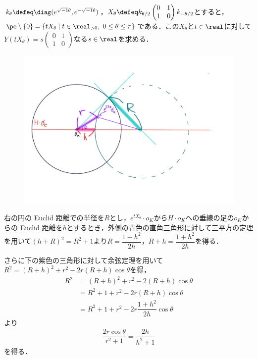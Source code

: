 \begin{npfwn}


  $k_{\theta} \defeq \diag(e^{\sqrt{-1}\theta},e^{-\sqrt{-1}\theta}) $，$X_{\theta} \defeq k_{\theta/2}
  \begin{pmatrix}
    0 & 1 \\ 1 & 0
  \end{pmatrix}
  k_{-\theta/2}$とすると，$\pe\setminus\{0\} =  \{tX_{\theta}\mid t\in \real_{>0},\ 0\leq \theta\leq \pi\}$である．この$X_{\theta} $と$t\in \real$に対して$Y(tX_{\theta} ) = s
  \begin{pmatrix}
    0 & 1 \\ 1 & 0
  \end{pmatrix}
  $なる$s\in \real $を求める．


  
  \begin{figure}[H]
    \centering
    \includegraphics[scale=0.3]{../graph/prob-eg-2.pdf}
    \caption{}
    \label{fig:prob-eg-1}
  \end{figure}

  右の円の Euclid 距離での半径を$R$とし，$e^{tX_{\theta}}\cdot o_K $から$H\cdot o_K$への垂線の足の$o_K$からの Euclid 距離を$h$とするとき，外側の青色の直角三角形に対して三平方の定理を用いて$(h+R)^2 = R^2 +  1 $より$R = \dfrac{1-h^2}{2h}$，$R+h = \dfrac{1+h^2}{2h}  $を得る．

  さらに下の紫色の三角形に対して余弦定理を用いて${R^2 = (R+h)^2 + r^2 - 2r(R+h)\cos\theta }$を得，
  \begin{align*}
    R^2 &= (R+h)^2 + r^2 - 2(R+h) \cos\theta \\
        &= R^2 +  1 + r^2 - 2r(R+h) \cos\theta \\
        &= R^2 +  1 + r^2 - 2r\dfrac{1+h^2}{2h} \cos\theta  
  \end{align*}
  より
  \begin{align}
    {\dfrac{2r\cos\theta}{r^2 + 1} = \dfrac{2h}{h^2 + 1} }\label{eq:1018-main}
  \end{align}
  を得る．


\end{npfwn}
